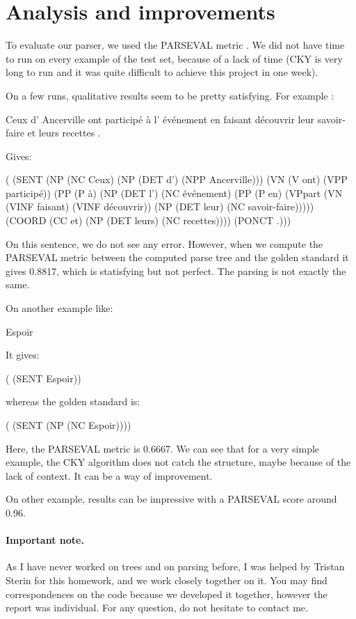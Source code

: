 \documentclass[11pt]{article}
\begin{document}

\section{Analysis and improvements} %
\label{sec:analysis_and_improvements}
To evaluate our parser, we used the PARSEVAL metric \cite{parseval}. We did not have time to run on every example of the test set, because of a lack of time (CKY is very long to run and it was quite difficult to achieve this project in one week).

  On a few runs, qualitative results seem to be pretty satisfying. For example : 

  Ceux d' Ancerville ont participé à l' événement en faisant découvrir leur savoir-faire et leurs recettes .
  
  Gives:
  
  ( (SENT (NP (NC Ceux) (NP (DET d') (NPP Ancerville))) (VN (V ont) (VPP participé)) (PP (P à) (NP (DET l') (NC événement) (PP (P en) (VPpart (VN (VINF faisant) (VINF découvrir)) (NP (DET leur) (NC savoir-faire))))) (COORD (CC et) (NP (DET leurs) (NC recettes)))) (PONCT .)))

  On this sentence, we do not see any error. However, when we compute the PARSEVAL metric between the computed parse tree and the golden standard it gives 0.8817, which is statisfying but not perfect. The parsing is not exactly the same.

  On another example like:

  Espoir

  It gives:

  ( (SENT Espoir))

  whereas the golden standard is:

  ( (SENT (NP (NC Espoir))))

  Here, the PARSEVAL metric is 0.6667. We can see that for a very simple example, the CKY algorithm does not catch the structure, maybe because of the lack of context. It can be a way of improvement.

  On other example, results can be impressive with a PARSEVAL score around 0.96.



 \paragraph{Important note.} %
 \label{par:important_note}
 As I have never worked on trees and on parsing before, I was helped by Tristan Sterin for this homework, and we work closely together on it. You may find correspondences on the code because we developed it together, however the report was individual. For any question, do not hesitate to contact me.

\printbibliography[title={References}]
\end{document}
